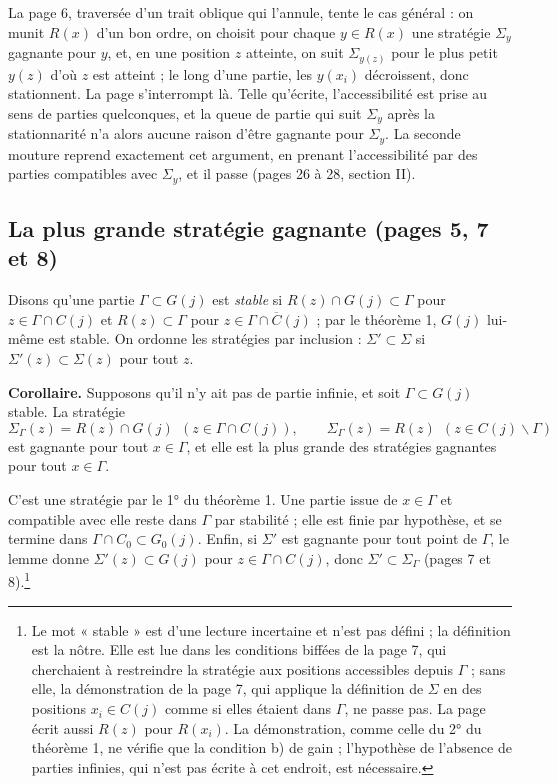 \documentclass[11pt,a4paper]{article}
\begin{document}
La page 6, traversée d'un trait oblique qui l'annule, tente le cas général :
on munit $R(x)$ d'un bon ordre, on choisit pour chaque $y \in R(x)$ une
stratégie $\Sigma_y$ gagnante pour $y$, et, en une position $z$ atteinte, on
suit $\Sigma_{y(z)}$ pour le plus petit $y(z)$ d'où $z$ est atteint ; le
long d'une partie, les $y(x_i)$ décroissent, donc stationnent. La page
s'interrompt là. Telle qu'écrite, l'accessibilité est prise au sens de
parties quelconques, et la queue de partie qui suit $\Sigma_y$ après la
stationnarité n'a alors aucune raison d'être gagnante pour $\Sigma_y$. La
seconde mouture reprend exactement cet argument, en prenant l'accessibilité
par des parties compatibles avec $\Sigma_y$, et il passe (pages 26 à 28,
section II).

\subsection*{La plus grande stratégie gagnante (pages 5, 7 et 8)}

Disons qu'une partie $\Gamma \subset G(j)$ est \emph{stable} si
$R(z) \cap G(j) \subset \Gamma$ pour $z \in \Gamma \cap C(j)$ et
$R(z) \subset \Gamma$ pour $z \in \Gamma \cap \overline{C}(j)$ ; par le
théorème 1, $G(j)$ lui-même est stable. On ordonne les stratégies par
inclusion : $\Sigma' \subset \Sigma$ si $\Sigma'(z) \subset \Sigma(z)$ pour
tout $z$.

\textbf{Corollaire.} Supposons qu'il n'y ait pas de partie infinie, et soit
$\Gamma \subset G(j)$ stable. La stratégie
\[
\Sigma_\Gamma(z) = R(z) \cap G(j) \ \ (z \in \Gamma \cap C(j)),
\qquad
\Sigma_\Gamma(z) = R(z) \ \ (z \in C(j) \smallsetminus \Gamma)
\]
est gagnante pour tout $x \in \Gamma$, et elle est la plus grande des
stratégies gagnantes pour tout $x \in \Gamma$.

C'est une stratégie par le 1° du théorème 1. Une partie issue de
$x \in \Gamma$ et compatible avec elle reste dans $\Gamma$ par stabilité ;
elle est finie par hypothèse, et se termine dans
$\Gamma \cap C_0 \subset G_0(j)$. Enfin, si $\Sigma'$ est gagnante pour tout
point de $\Gamma$, le lemme donne $\Sigma'(z) \subset G(j)$ pour
$z \in \Gamma \cap C(j)$, donc $\Sigma' \subset \Sigma_\Gamma$ (pages 7 et
8).\footnote{Le mot « stable » est d'une lecture incertaine et n'est pas
défini ; la définition est la nôtre. Elle est lue dans les conditions
biffées de la page 7, qui cherchaient à restreindre la stratégie aux
positions accessibles depuis $\Gamma$ ; sans elle, la démonstration de la page
7, qui applique la définition de $\Sigma$ en des positions $x_i \in C(j)$
comme si elles étaient dans $\Gamma$, ne passe pas. La page écrit aussi
$R(z)$ pour $R(x_i)$. La démonstration, comme celle du 2° du théorème 1, ne
vérifie que la condition b) de gain ; l'hypothèse de l'absence de parties
infinies, qui n'est pas écrite à cet endroit, est nécessaire.}
\end{document}
